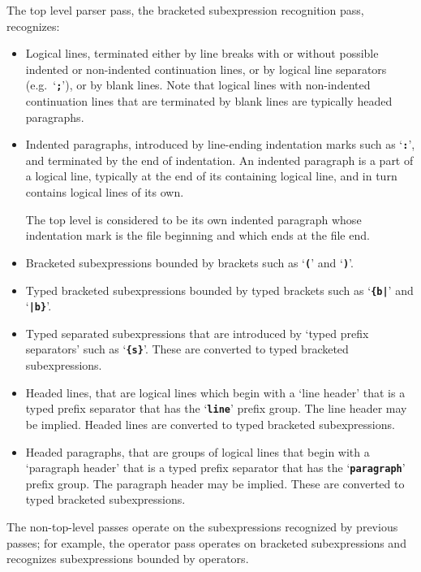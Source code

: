 \documentclass[12pt]{article}
\newcommand{\TT}[1]{{\tt \bfseries #1}}
\begin{document}
The top level parser pass, the bracketed subexpression recognition pass,
recognizes:
\begin{itemize}

\item Logical lines, terminated either by line breaks with or without
possible indented or non-indented
continuation lines, or by logical line separators
(e.g.~`\TT{;}'), or by blank lines.  Note that logical
lines with non-indented continuation lines that are
terminated by blank lines are typically headed paragraphs.

\item Indented paragraphs, introduced by line-ending
indentation marks such as `\TT{:}', and terminated by the end of indentation.
An indented paragraph is a part of a logical
line, typically at the end of its containing logical line,
and in turn contains logical lines of its own.

The top level is considered to be its own indented paragraph whose
indentation mark is the file beginning and which ends at the file end.

\item Bracketed subexpressions bounded by brackets
such as `\TT{(}' and `\TT{)}'.

\item Typed bracketed subexpressions bounded by typed brackets
such as `\TT{\{b|}' and `\TT{|b\}}'.

\item Typed separated subexpressions that are introduced by 
`typed prefix separators' such as `\TT{\{s\}}'.
These are converted to typed bracketed subexpressions.

\item Headed lines, that are logical lines which begin with
a `line header' that is
a typed prefix separator that has the `\TT{line}' prefix group.
The line header may be implied.
Headed lines are converted to typed bracketed subexpressions.

\item Headed paragraphs, that are groups of logical lines
that begin with a `paragraph header' that is
a typed prefix separator that has the `\TT{paragraph}' prefix group.
The paragraph header may be implied.
These are converted to typed bracketed subexpressions.

\end{itemize}

The non-top-level passes
operate on the subexpressions recognized by previous passes;
for example, the operator pass operates on bracketed subexpressions
and recognizes
subexpressions bounded by operators.
\end{document}
